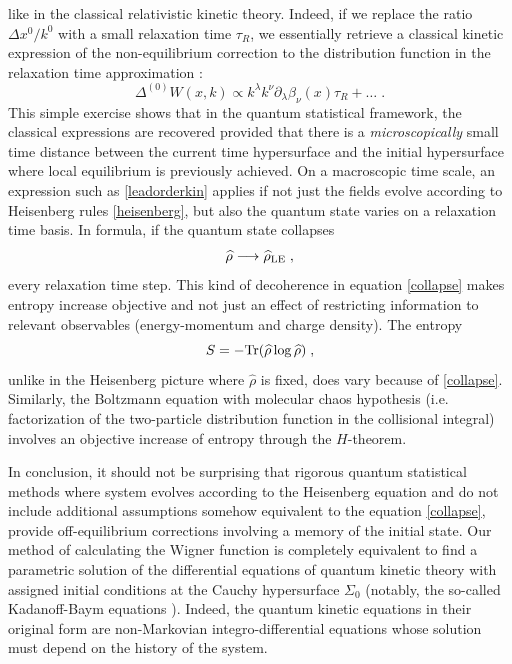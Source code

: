 \documentclass[prd,superscriptaddress,nofootinbib,notitlepage]{revtex4-1}
\def\wrho{{\widehat{\rho}}}
\newcommand{\Tr}{{\rm Tr}}
\newcommand{\be}{\begin{equation}}
\newcommand{\ee}{\end{equation}}
\begin{document}
like in the classical relativistic kinetic theory. Indeed, if we replace the ratio $\Delta x^0/k^0$ with a small relaxation
time $\tau_R$, we essentially retrieve a classical kinetic expression of the non-equilibrium correction to the distribution
function in the relaxation time approximation \cite{Romatschke:2017ejr}:
%
\be\label{leadorderkin}
 \Delta^{(0)}W\left(x,k\right) \propto  k^\lambda k^\nu \partial_\lambda \beta_\nu (x) \tau_R + \ldots\;.
\ee
%
This simple exercise shows that in the quantum statistical framework, the classical expressions are recovered provided that there 
is a {\em microscopically} small time distance between the current time hypersurface and the initial hypersurface where local 
equilibrium is previously achieved. On a macroscopic time scale, an expression such as \eqref{leadorderkin} applies if not just 
the fields evolve according to Heisenberg rules \eqref{heisenberg}, but also the quantum state varies on a relaxation time basis. 
In formula, if the quantum state collapses
%
\be\label{collapse}
 \wrho \longrightarrow \wrho_{\rm LE}\;,
\ee
%
every relaxation time step. This kind of decoherence in equation \eqref{collapse} makes entropy increase objective and 
not just an effect of restricting information to relevant observables (energy-momentum and charge density). The entropy 
%
$$
  S = -\Tr (\wrho \log \wrho)\;,
$$
%
unlike in the Heisenberg picture where $\wrho$ is fixed, does vary because of \eqref{collapse}. Similarly, the Boltzmann equation 
with molecular chaos hypothesis (i.e. factorization of the two-particle distribution function in the collisional integral) involves an objective increase of entropy through the $H$-theorem.

In conclusion, it should not be surprising that rigorous quantum statistical methods where system evolves according to the Heisenberg 
equation and do not include additional assumptions somehow equivalent to the equation \eqref{collapse}, provide off-equilibrium corrections
involving a memory of the initial state. Our method of calculating the Wigner function is completely equivalent to find a parametric 
solution of the differential equations of quantum kinetic theory with assigned initial conditions at the Cauchy hypersurface $\Sigma_0$
(notably, the so-called Kadanoff-Baym equations \cite{Berges:2004yj}). Indeed, the quantum kinetic equations in their original form 
are non-Markovian integro-differential equations whose solution must depend on the history of the system. 

\end{document}
